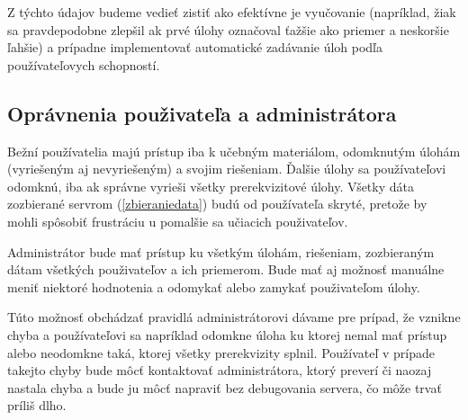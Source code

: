 Z týchto údajov budeme vedieť zistiť ako efektívne je vyučovanie (napríklad, žiak sa pravdepodobne zlepšil ak prvé úlohy označoval ťažšie ako priemer a neskoršie ľahšie) a prípadne implementovať automatické zadávanie úloh podľa používateľovych schopností.

\subsection{Oprávnenia použivateľa a administrátora}
Bežní používatelia majú prístup iba k učebným materiálom, odomknutým úlohám (vyriešeným aj nevyriešeným) a svojim riešeniam. Ďalšie úlohy sa používateľovi odomknú, iba ak správne vyrieši všetky prerekvizitové úlohy. Všetky dáta zozbierané servrom (\ref{zbieraniedata}) budú od používateľa skryté, pretože by mohli spôsobiť frustráciu u pomalšie sa učiacich použivateľov.

Administrátor bude mať prístup ku všetkým úlohám, riešeniam, zozbieraným dátam všetkých použivateľov a ich priemerom. Bude mať aj možnosť manuálne meniť niektoré hodnotenia a odomykať alebo zamykať použivateľom úlohy.

Túto možnosť obchádzať pravidlá administrátorovi dávame pre prípad, že vznikne chyba a používateľovi sa napríklad odomkne úloha ku ktorej nemal mať prístup alebo neodomkne taká, ktorej všetky prerekvizity splnil. Používateľ v prípade takejto chyby bude môcť kontaktovať administrátora, ktorý preverí či naozaj nastala chyba a bude ju môcť napraviť bez debugovania servera, čo môže trvať príliš dlho.
